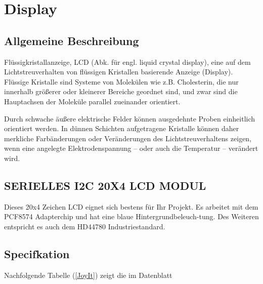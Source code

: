 %
%
%


\chapter{Display}

\section{Allgemeine Beschreibung}

Flüssigkristallanzeige, LCD (Abk. für engl. liquid crystal display), eine auf dem Lichtstreuverhalten von flüssigen Kristallen basierende Anzeige (Display). Flüssige Kristalle sind Systeme von Molekülen wie z.B. Cholesterin, die nur innerhalb größerer oder kleinerer Bereiche geordnet sind, und zwar sind die Hauptachsen der Moleküle parallel zueinander orientiert.

Durch schwache äußere elektrische Felder können ausgedehnte Proben einheitlich orientiert werden. In dünnen Schichten aufgetragene Kristalle können daher merkliche Farbänderungen oder Veränderungen des Lichtstreuverhaltens zeigen, wenn eine angelegte Elektrodenspannung – oder auch die Temperatur – verändert wird. 

\section{SERIELLES I2C 20X4 LCD MODUL}

Dieses 20x4 Zeichen LCD eignet sich bestens für Ihr Projekt. Es arbeitet mit dem PCF8574 Adapterchip und hat eine blaue Hintergrundbeleuch-tung. Des Weiteren entspricht es auch dem HD44780 Industriestandard.

\section{Specifkation}

Nachfolgende Tabelle (\ref{JoyIt}) zeigt die im Datenblatt %

